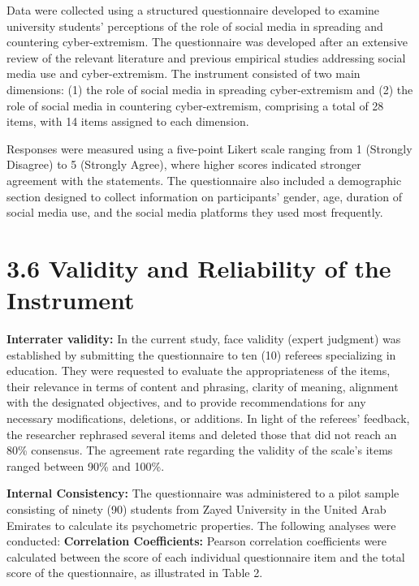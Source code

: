 \documentclass[10pt]{NSP1}
\begin{document}
	Data were collected using a structured questionnaire developed to examine university students' perceptions of the role of social media in spreading and countering cyber-extremism. The questionnaire was developed after an extensive review of the relevant literature and previous empirical studies addressing social media use and cyber-extremism. The instrument consisted of two main dimensions: (1) the role of social media in spreading cyber-extremism and (2) the role of social media in countering cyber-extremism, comprising a total of 28 items, with 14 items assigned to each dimension.
	
	Responses were measured using a five-point Likert scale ranging from 1 (Strongly Disagree) to 5 (Strongly Agree), where higher scores indicated stronger agreement with the statements. The questionnaire also included a demographic section designed to collect information on participants' gender, age, duration of social media use, and the social media platforms they used most frequently.
	
	\section*{3.6 Validity and Reliability of the Instrument}
	
	\noindent\textbf{Interrater validity:} In the current study, face validity (expert judgment) was established by submitting the questionnaire to ten (10) referees specializing in education. They were requested to evaluate the appropriateness of the items, their relevance in terms of content and phrasing, clarity of meaning, alignment with the designated objectives, and to provide recommendations for any necessary modifications, deletions, or additions. In light of the referees' feedback, the researcher rephrased several items and deleted those that did not reach an 80\% consensus. The agreement rate regarding the validity of the scale's items ranged between 90\% and 100\%.
	
	\noindent\textbf{Internal Consistency:} The questionnaire was administered to a pilot sample consisting of ninety (90) students from Zayed University in the United Arab Emirates to calculate its psychometric properties. The following analyses were conducted: \textbf{Correlation Coefficients:} Pearson correlation coefficients were calculated between the score of each individual questionnaire item and the total score of the questionnaire, as illustrated in Table 2.
	
\end{document}
